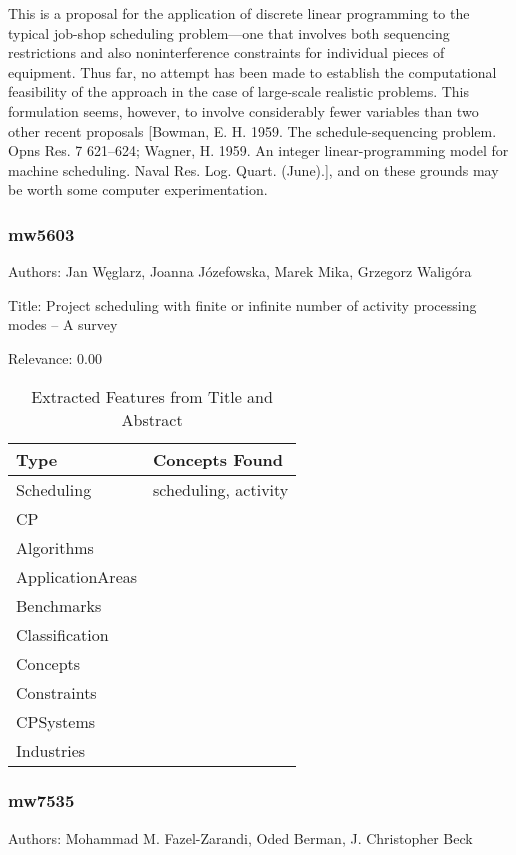   This is a proposal for the application of discrete linear programming to the typical job-shop scheduling problem—one that involves both sequencing restrictions and also noninterference constraints for individual pieces of equipment. Thus far, no attempt has been made to establish the computational feasibility of the approach in the case of large-scale realistic problems. This formulation seems, however, to involve considerably fewer variables than two other recent proposals [Bowman, E. H. 1959. The schedule-sequencing problem. Opns Res. 7 621–624; Wagner, H. 1959. An integer linear-programming model for machine scheduling. Naval Res. Log. Quart. (June).], and on these grounds may be worth some computer experimentation.  

\subsubsection{mw5603}
\label{mw:mw5603}

Authors: Jan Węglarz, Joanna Józefowska, Marek Mika, Grzegorz Waligóra

Title: Project scheduling with finite or infinite number of activity processing modes – A survey

Relevance:  0.00

{\scriptsize
\begin{longtable}{p{2cm}p{20cm}}
\caption{Extracted Features from Title and Abstract}\\ \toprule
Type & Concepts Found\\ \midrule
\endhead
\bottomrule
\endfoot
Scheduling & scheduling, activity\\ 
CP & \\ 
Algorithms & \\ 
ApplicationAreas & \\ 
Benchmarks & \\ 
Classification & \\ 
Concepts & \\ 
Constraints & \\ 
CPSystems & \\ 
Industries & \\ 
\end{longtable}
}



\subsubsection{mw7535}
\label{mw:mw7535}

Authors: Mohammad M. Fazel-Zarandi, Oded Berman, J. Christopher Beck

